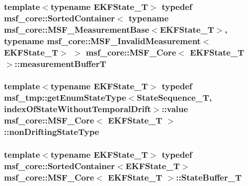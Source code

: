 \hypertarget{classmsf__core_1_1MSF__Core_abbdace8623ce8be7c430f6f7dad6b6fa}{
\subsubsection[{measurement\-Buffer\-T}]{\setlength{\rightskip}{0pt plus 5cm}template$<$typename E\-K\-F\-State\-\_\-\-T$>$ typedef {\bf msf\-\_\-core\-::\-Sorted\-Container}$<$ typename {\bf msf\-\_\-core\-::\-M\-S\-F\-\_\-\-Measurement\-Base}$<$E\-K\-F\-State\-\_\-\-T$>$, typename {\bf msf\-\_\-core\-::\-M\-S\-F\-\_\-\-Invalid\-Measurement}$<$E\-K\-F\-State\-\_\-\-T$>$ $>$ {\bf msf\-\_\-core\-::\-M\-S\-F\-\_\-\-Core}$<$ E\-K\-F\-State\-\_\-\-T $>$\-::{\bf measurement\-Buffer\-T}}}\label{classmsf__core_1_1MSF__Core_abbdace8623ce8be7c430f6f7dad6b6fa}
\hypertarget{classmsf__core_1_1MSF__Core_aca5d903b57559980415221fa95f5f32b}{
\subsubsection[{non\-Drifting\-State\-Type}]{\setlength{\rightskip}{0pt plus 5cm}template$<$typename E\-K\-F\-State\-\_\-\-T$>$ typedef msf\-\_\-tmp\-::get\-Enum\-State\-Type$<${\bf State\-Sequence\-\_\-\-T}, {\bf index\-Of\-State\-Without\-Temporal\-Drift}$>$\-::value {\bf msf\-\_\-core\-::\-M\-S\-F\-\_\-\-Core}$<$ E\-K\-F\-State\-\_\-\-T $>$\-::{\bf non\-Drifting\-State\-Type}\hspace{0.3cm}{\ttfamily [private]}}}\label{classmsf__core_1_1MSF__Core_aca5d903b57559980415221fa95f5f32b}
\hypertarget{classmsf__core_1_1MSF__Core_a71db0f8ef9e865ef4d85b7365f01388d}{
\subsubsection[{State\-Buffer\-\_\-\-T}]{\setlength{\rightskip}{0pt plus 5cm}template$<$typename E\-K\-F\-State\-\_\-\-T$>$ typedef {\bf msf\-\_\-core\-::\-Sorted\-Container}$<$E\-K\-F\-State\-\_\-\-T$>$ {\bf msf\-\_\-core\-::\-M\-S\-F\-\_\-\-Core}$<$ E\-K\-F\-State\-\_\-\-T $>$\-::{\bf State\-Buffer\-\_\-\-T}}}\label{classmsf__core_1_1MSF__Core_a71db0f8ef9e865ef4d85b7365f01388d}
